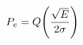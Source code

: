 \documentclass[preview]{standalone}
\begin{document}
\begin{align*}
\special{dvisvgm:raw <g id='unique000'>}P_e=Q\!\left(\frac{\sqrt E}{2\sigma}\right)\special{dvisvgm:raw </g>}
\end{align*}
\end{document}
